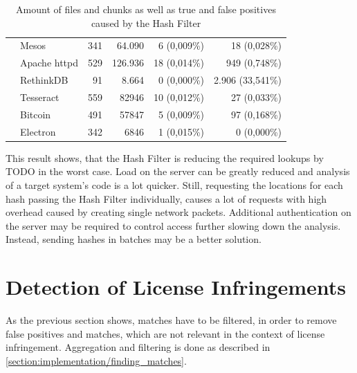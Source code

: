 \begin{table}[ht]
\begin{tabular}{l|lrrrr}
		& Mesos & 341 & 64.090 & 6 (0,009\%) & 18 (0,028\%) \\
		& Apache httpd & 529 & 126.936 & 18 (0,014\%) & 949 (0,748\%) \\
		& RethinkDB & 91 & 8.664 & 0 (0,000\%) & 2.906 (33,541\%) \\
		& Tesseract & 559 & 82946 & 10 (0,012\%) & 27 (0,033\%) \\
		& Bitcoin & 491 & 57847 & 5 (0,009\%) & 97 (0,168\%) \\
		& Electron & 342 & 6846 & 1 (0,015\%) & 0 (0,000\%) \\
	\end{tabular}
	\caption{Amount of files and chunks as well as true and false positives caused by the Hash Filter}\label{table:unfiltered_findings}
\end{table}

This result shows, that the Hash Filter is reducing the required lookups by TODO in the worst case.
Load on the server can be greatly reduced and analysis of a target system's code is a lot quicker.
Still, requesting the locations for each hash passing the Hash Filter individually, causes a lot of requests with high overhead caused by creating single network packets.
Additional authentication on the server may be required to control access further slowing down the analysis.
Instead, sending hashes in batches may be a better solution.

\section{Detection of License Infringements}
As the previous section shows, matches have to be filtered, in order to remove false positives and matches, which are not relevant in the context of license infringement.
Aggregation and filtering is done as described in \autoref{section:implementation/finding_matches}.

